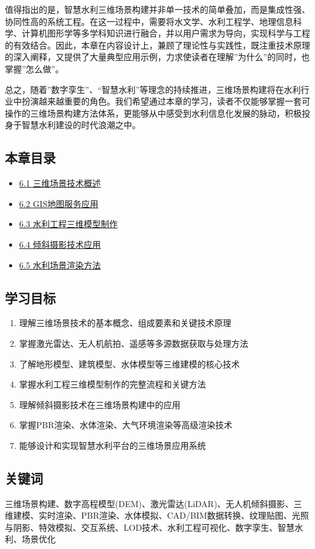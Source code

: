 值得指出的是，智慧水利三维场景构建并非单一技术的简单叠加，而是集成性强、协同性高的系统工程。在这一过程中，需要将水文学、水利工程学、地理信息科学、计算机图形学等多学科知识进行融合，并以用户需求为导向，实现科学与工程的有效结合。因此，本章在内容设计上，兼顾了理论性与实践性，既注重技术原理的深入阐释，又提供了大量典型应用示例，力求使读者在理解''为什么''的同时，也掌握''怎么做''。

总之，随着''数字孪生''、``智慧水利''等理念的持续推进，三维场景构建将在水利行业中扮演越来越重要的角色。我们希望通过本章的学习，读者不仅能够掌握一套可操作的三维场景构建方法体系，更能够从中感受到水利信息化发展的脉动，积极投身于智慧水利建设的时代浪潮之中。

\subsection{本章目录}\label{ux672cux7ae0ux76eeux5f55}

\begin{itemize}
\tightlist
\item
  \href{section06-01.md}{6.1 三维场景技术概述}
\item
  \href{section06-02.md}{6.2 GIS地图服务应用}
\item
  \href{section06-03.md}{6.3 水利工程三维模型制作}
\item
  \href{section06-04.md}{6.4 倾斜摄影技术应用}
\item
  \href{section06-05.md}{6.5 水利场景渲染方法}
\end{itemize}

\subsection{学习目标}\label{ux5b66ux4e60ux76eeux6807}

\begin{enumerate}
\def\labelenumi{\arabic{enumi}.}
\tightlist
\item
  理解三维场景技术的基本概念、组成要素和关键技术原理
\item
  掌握激光雷达、无人机航拍、遥感等多源数据获取与处理方法
\item
  了解地形模型、建筑模型、水体模型等三维建模的核心技术
\item
  掌握水利工程三维模型制作的完整流程和关键方法
\item
  理解倾斜摄影技术在三维场景构建中的应用
\item
  掌握PBR渲染、水体渲染、大气环境渲染等高级渲染技术
\item
  能够设计和实现智慧水利平台的三维场景应用系统
\end{enumerate}

\subsection{关键词}\label{ux5173ux952eux8bcd}

三维场景构建、数字高程模型(DEM)、激光雷达(LiDAR)、无人机倾斜摄影、三维建模、实时渲染、PBR渲染、水体模拟、CAD/BIM数据转换、纹理贴图、光照与阴影、特效模拟、交互系统、LOD技术、水利工程可视化、数字孪生、智慧水利、场景优化
